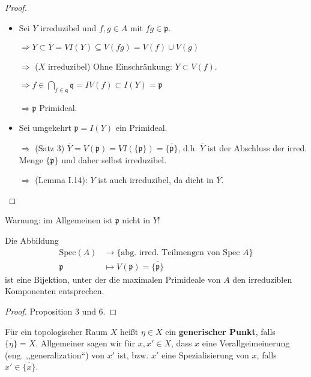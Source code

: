 \begin{proof} \mbox{}
  \begin{itemize}
  \item Sei $Y$ irreduzibel und $f,g\in A$ mit $fg\in\mathfrak{p}$.

    $\Rightarrow Y\subset\overline{Y}=VI(Y)\subseteq V(fg)=V(f)\cup V(g)$

    $\Rightarrow$ ($X$ irreduzibel) Ohne Einschränkung: $Y\subset V(f)$.

    $\Rightarrow
    f\in\bigcap_{f\in\mathfrak{q}}\mathfrak{q}=IV(f)\subset
    I(Y)=\mathfrak{p}$

    $\Rightarrow\mathfrak{p}$ Primideal.
  \item Sei umgekehrt $\mathfrak{p}=I(Y)$ ein Primideal.

    $\Rightarrow$ (Satz 3)
    $\overline{Y}=V(\mathfrak{p})=VI(\{\mathfrak{p}\})=\overline{\{\mathfrak{p}\}}$,
    d.h. $\overline{Y}$ ist der Abschluss der irred. Menge
    $\{\mathfrak{p}\}$ und daher selbst irreduzibel.

    $\Rightarrow$ (Lemma I.14): $Y$ ist auch irreduzibel, da dicht in
    $\overline{Y}$.
  \end{itemize}
\end{proof}
Warnung: im Allgemeinen ist $\mathfrak{p}$ nicht in $Y$!

\begin{cor}
  Die Abbildung
  \begin{align*}
    \text{Spec}(A) & \longrightarrow\text{\{abg. irred. Teilmengen von Spec }A\}\\
    \mathfrak{p} & \longmapsto V(\mathfrak{p})=\overline{\{\mathfrak{p}\}}
  \end{align*}
  ist eine Bijektion, unter der die maximalen Primideale von $A$ den
  irreduziblen Komponenten entsprechen.
\end{cor}

\begin{proof} Proposition 3 und 6.
\end{proof}

\begin{defn}
  Für ein topologischer Raum $X$ heißt $\eta\in X$ ein
  \textbf{generischer Punkt}, falls
  $\overline{\{\eta\}}=X$. Allgemeiner sagen wir für $x,x'\in X$, dass
  $x$ eine Verallgeimeinerung (eng. ,,generalization``) von $x'$ ist,
  bzw. $x'$ eine Spezialisierung von $x$, falls
  $x'\in\overline{\{x\}}$.
\end{defn}

